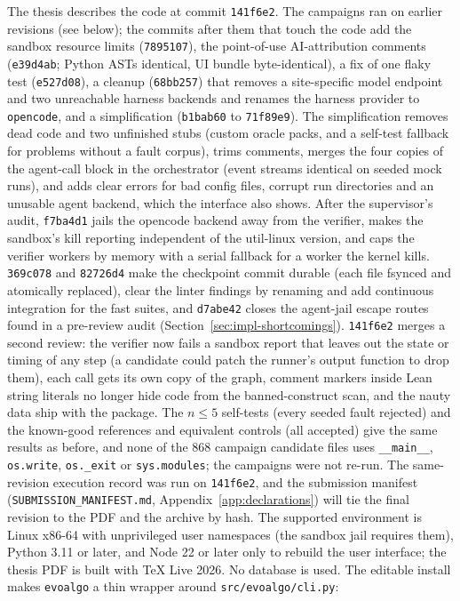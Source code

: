 The thesis describes the code at commit \texttt{141f6e2}. The campaigns ran on
earlier revisions (see below); the commits after them that touch the code add the
sandbox resource limits (\texttt{7895107}), the point-of-use AI-attribution
comments (\texttt{e39d4ab}; Python ASTs identical, UI bundle byte-identical), a
fix of one flaky test (\texttt{e527d08}), a cleanup (\texttt{68bb257}) that
removes a site-specific model endpoint and two unreachable harness backends and
renames the harness provider to \texttt{opencode}, and a simplification
(\texttt{b1bab60} to \texttt{71f89e9}). The simplification removes dead code
and two unfinished stubs (custom oracle packs, and a self-test fallback for
problems without a fault corpus), trims comments, merges the four copies of the
agent-call block in the orchestrator (event streams identical on seeded mock
runs), and adds clear errors for bad config files, corrupt run directories and
an unusable agent backend, which the interface also shows. After the
supervisor's audit, \texttt{f7ba4d1} jails the opencode backend away from the
verifier, makes the sandbox's kill reporting independent of the util-linux
version, and caps the verifier workers by memory with a serial fallback for a
worker the kernel kills. \texttt{369c078} and \texttt{82726d4} make the checkpoint
commit durable (each file fsynced and atomically replaced), clear the linter
findings by renaming and add continuous integration for the fast suites, and
\texttt{d7abe42} closes the agent-jail escape routes found in a pre-review audit
(Section~\ref{sec:impl-shortcomings}). \texttt{141f6e2} merges a second review:
the verifier now fails a sandbox report that leaves out the state or timing of
any step (a candidate could patch the runner's output function to drop them),
each call gets its own copy of the graph, comment markers inside Lean string
literals no longer hide code from the banned-construct scan, and the nauty
data ship with the package. The $n \le 5$ self-tests (every seeded fault
rejected) and the known-good references and equivalent controls (all accepted)
give the same results as before, and none of the 868 campaign candidate
files uses \texttt{\_\_main\_\_}, \texttt{os.write}, \texttt{os.\_exit} or
\texttt{sys.modules}; the campaigns were not re-run. The
same-revision execution record was run on \texttt{141f6e2}, and the submission manifest
(\texttt{SUBMISSION\_MANIFEST.md}, Appendix~\ref{app:declarations}) will tie the
final revision to the PDF and the archive by hash. The supported environment is
Linux x86-64 with unprivileged user namespaces (the sandbox jail requires them),
Python 3.11 or later, and Node 22 or later only to rebuild the user interface; the thesis
PDF is built with TeX Live 2026. No database is used. The editable install makes
\texttt{evoalgo} a thin wrapper around \texttt{src/evoalgo/cli.py}:

